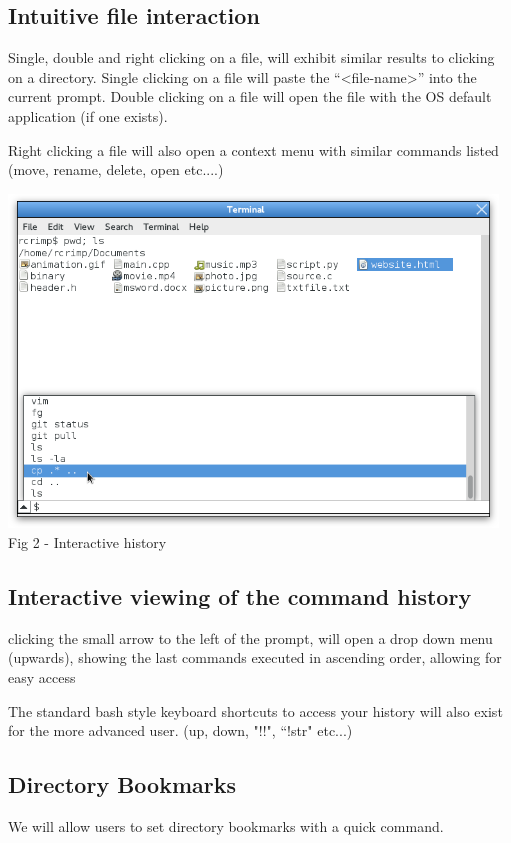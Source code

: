 \documentclass[a4paper,12pt]{article}
\begin{document}
\subsection*{Intuitive file interaction}
Single, double and right clicking on a file, will exhibit similar results to clicking on a directory.
Single clicking on a file will paste the ``\textless file-name\textgreater'' into the current prompt.
Double clicking on a file will open the file with the OS default application (if one exists).

Right clicking a file will also  open a context menu with similar commands listed (move, rename, delete, open etc....)

\begin{center}
  \includegraphics[width=13cm]{history2.png}\\
  \small Fig 2 - Interactive history
\end{center}

\subsection*{Interactive viewing of the command history}
clicking the small arrow to the left of the prompt, will open a drop down menu (upwards), showing the last commands executed in ascending order, allowing for easy access

The standard bash style keyboard shortcuts to access your history will also exist for the
more advanced user. (up, down, "!!", ``!str" etc...)

\subsection*{Directory Bookmarks}
We will allow users to set directory bookmarks with a quick command.
\end{document}
